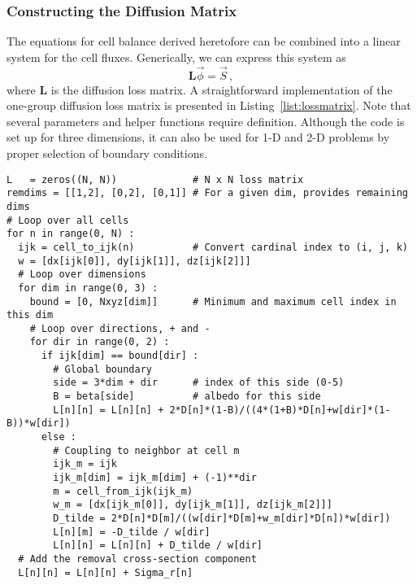 \subsubsection{Constructing the Diffusion Matrix}

The equations for cell balance derived heretofore can be combined into 
a linear system for the cell fluxes.  Generically, we can express this 
system as
\begin{equation}
 \mathbf{L}\vec{\phi} = \vec{S} \, ,
\end{equation}
where $\mathbf{L}$ is the  diffusion loss matrix. 
A straightforward implementation of the one-group diffusion loss matrix 
is presented in Listing~\ref{list:lossmatrix}.  Note that several 
parameters and helper functions require definition.  Although the 
code is set up for three dimensions, it can also be used for 1-D 
and 2-D problems by proper selection of boundary conditions.

\begin{lstlisting}
L   = zeros((N, N))             # N x N loss matrix
remdims = [[1,2], [0,2], [0,1]] # For a given dim, provides remaining dims
# Loop over all cells
for n in range(0, N) :
  ijk = cell_to_ijk(n)          # Convert cardinal index to (i, j, k)
  w = [dx[ijk[0]], dy[ijk[1]], dz[ijk[2]]]
  # Loop over dimensions
  for dim in range(0, 3) :
    bound = [0, Nxyz[dim]]      # Minimum and maximum cell index in this dim
    # Loop over directions, + and -
    for dir in range(0, 2) :
      if ijk[dim] == bound[dir] :
        # Global boundary
        side = 3*dim + dir      # index of this side (0-5)
        B = beta[side]          # albedo for this side
        L[n][n] = L[n][n] + 2*D[n]*(1-B)/((4*(1+B)*D[n]+w[dir]*(1-B))*w[dir])
      else :
        # Coupling to neighbor at cell m
        ijk_m = ijk
        ijk_m[dim] = ijk_m[dim] + (-1)**dir
        m = cell_from_ijk(ijk_m)
        w_m = [dx[ijk_m[0]], dy[ijk_m[1]], dz[ijk_m[2]]]
        D_tilde = 2*D[n]*D[m]/((w[dir]*D[m]+w_m[dir]*D[n])*w[dir])
        L[n][m] = -D_tilde / w[dir]
        L[n][n] = L[n][n] + D_tilde / w[dir]
  # Add the removal cross-section component
  L[n][n] = L[n][n] + Sigma_r[n]
\end{lstlisting}


